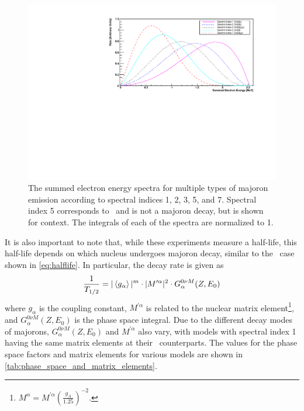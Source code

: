 \begin{figure}[htbp]
    \centering
    \includegraphics[width=0.9\linewidth]{Figures/Majoron_rates.pdf}
    \caption[The summed electron energy spectra for multiple types of majoron emission according to spectral indices 1, 2, 3, 5, and 7]
    {The summed electron energy spectra for multiple types of majoron emission according to spectral indices 1, 2, 3, 5, and 7.
    Spectral index 5 corresponds to \twonubb~and is not a majoron decay, but is shown for context.
    The integrals of each of the spectra are normalized to 1.}
    \label{fig:Majoron Spectrum}
\end{figure}

It is also important to note that, while these experiments measure a half-life, this half-life depends on which nucleus undergoes majoron decay, similar to the \zeronubb~case shown in \autoref{eq:halflife}.
In particular, the decay rate is given as
\begin{align}
    \frac{1}{T_{1/2}}=|\braket{g_\alpha}|^m \cdot |M^{\prime \alpha}|^2 \cdot G^{0\nu M}_\alpha (Z,E_0)
    \label{eq:Majoron_halflife}
\end{align}
where $g_\alpha$ is the coupling constant, $M^{\prime\alpha}$ is related to the nuclear matrix element\footnote{$M^\alpha = M^{\prime \alpha}(\frac{g_A}{1.25})^{-2}$.}, and $G^{0\nu M}_\alpha (Z,E_0)$ is the phase space integral.
Due to the different decay modes of majorons, $G^{0\nu M}_\alpha (Z,E_0)$ and $M^{\prime \alpha}$ also vary, with models with spectral index 1 having the same matrix elements at their \zeronubb~counterparts.
The values for the phase space factors and matrix elements for various models are shown in \autoref{tab:phase_space_and_matrix_elements}.

